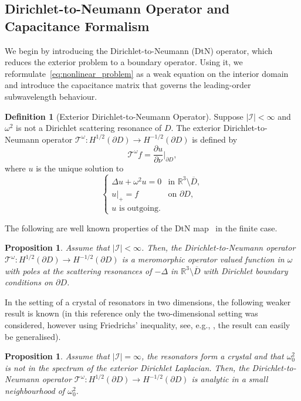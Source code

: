 \documentclass[a4paper,reqno,twoside]{amsart}
\numberwithin{equation}{section}
\newtheorem{proposition}[theorem]{Proposition}
\theoremstyle{definition}
\newtheorem{definition}[theorem]{Definition}
\newcommand{\<}{\ensuremath \leq}
\renewcommand{\>}{\ensuremath \geq}
\begin{document}
\subsection{Dirichlet-to-Neumann Operator and Capacitance Formalism}
We begin by introducing the Dirichlet-to-Neumann (DtN) operator, which reduces the exterior problem to a boundary operator. Using it, we reformulate~\eqref{eq:nonlinear_problem} as a weak equation on the interior domain and introduce the capacitance matrix that governs the leading-order subwavelength behaviour.

\begin{definition}[Exterior Dirichlet-to-Neumann Operator]
    Suppose $\lvert \mathcal{I}\rvert<\infty$ and $\omega^2$ is not a {Dirichlet scattering resonance} of $D$. The exterior Dirichlet-to-Neumann operator $\mathcal{T}^\omega : H^{1/2}(\partial D) \to H^{-1/2}(\partial D)$ is defined by
    \begin{equation}
        \mathcal{T}^\omega f = \frac{\partial u}{\partial \nu}\bigg|_{\partial D},
    \end{equation}
    where $u$ is the unique solution to
    \begin{equation}
        \begin{cases}
            \Delta u + \omega^2 u = 0 & \text{in } \mathbb{R}^3 \setminus \overline{D},\\
            u\big|_+ = f & \text{on } \partial D,\\
            u \text{  is outgoing.}
        \end{cases}
    \end{equation}
\end{definition}
The following are well known properties of the DtN map~\cite{fepponSubwavelength2024, ammariFull1999,zworski} in the finite case.

\begin{proposition}\label{prop:dtn_analytic} 
    Assume that $\lvert \mathcal{I}\rvert<\infty$. Then, the Dirichlet-to-Neumann operator $\mathcal{T}^\omega : H^{1/2}(\partial D) \to H^{-1/2}(\partial D)$  is a meromorphic operator valued function in $\omega$ with poles at 
    the scattering resonances of  $-\Delta$ in $\mathbb{R}^3\setminus \overline{D}$ with Dirichlet boundary conditions on $\partial D$.
\end{proposition}
In the setting of a {crystal} of resonators {in two dimensions}, the following weaker result is known \cite[Proposition 2.2]{ammari2025analysis}(in this reference only the two-dimensional setting was considered, however using Friedrichs' inequality, see, e.g., \cite{Neas2012}, the result can easily be generalised).
\begin{proposition}\label{prop:dtn_analytic_periodic}
    Assume that $\lvert \mathcal{I}\rvert=\infty$, the resonators form a crystal and that $\omega^2_0$ is not in the spectrum of the exterior Dirichlet Laplacian. Then, the Dirichlet-to-Neumann operator $\mathcal{T}^\omega : H^{1/2}(\partial D) \to H^{-1/2}(\partial D)$  is analytic in a small neighbourhood of $\omega_0^2$.
\end{proposition}
\end{document}
